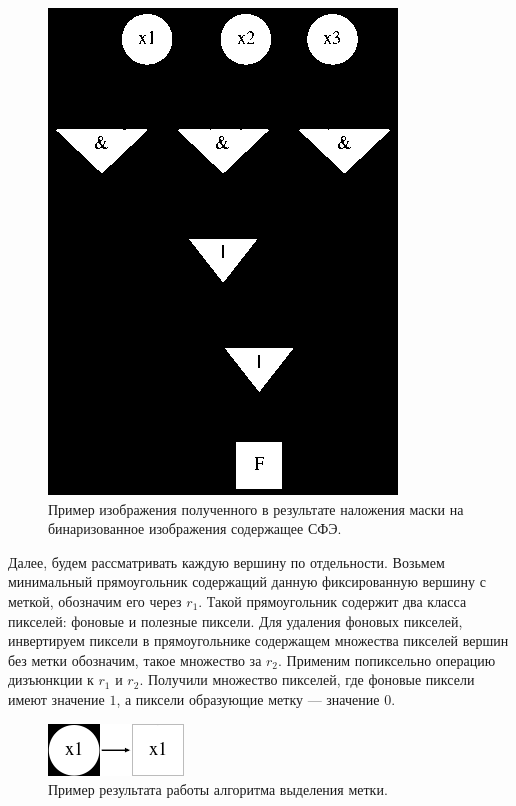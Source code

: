 \documentclass[makeidx, a4paper, 14pt]{extarticle}
\begin{document}
\begin{figure}[H]
    \centering
    \includegraphics[scale=0.75]{img4_masked_vertices_labels.png}
    \caption{Пример изображения полученного в результате наложения маски на бинаризованное изображения содержащее СФЭ.}
\end{figure}

Далее, будем рассматривать каждую вершину по отдельности. Возьмем минимальный прямоугольник содержащий данную фиксированную вершину с меткой, обозначим
его через $r_1$. Такой прямоугольник содержит два класса пикселей: фоновые и полезные пиксели. Для удаления фоновых пикселей, инвертируем пиксели в
прямоугольнике содержащем множества пикселей вершин без метки обозначим, такое множество за $r_2$. Применим попиксельно операцию дизъюнкции к $r_1$ и $r_2$. Получили множество пикселей, где фоновые пиксели имеют значение
$1$, а пиксели образующие метку --- значение $0$.

\begin{figure}[H]
    \centering
    \includegraphics[scale=4]{label_detection.png}
    \caption{Пример результата работы алгоритма выделения метки.}
\end{figure}
\end{document}
